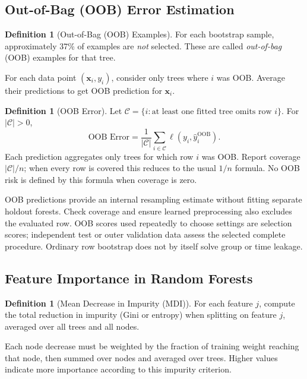 \documentclass[11pt,twoside]{article}
\numberwithin{equation}{section}
\newcommand{\vect}[1]{\bm{#1}}
\theoremstyle{plain}
\theoremstyle{definition}
\newtheorem{definition}[theorem]{Definition}
\theoremstyle{remark}
\newenvironment{keyidea}{
  \begin{tcolorbox}[colback=yellow!5!white,
                    colframe=yellow!50!black,
                    title=Key Idea,
                    breakable,
                    enhanced,
                    sharp corners,
                    boxrule=0.8pt,
                    left=6pt, right=6pt, top=6pt, bottom=6pt]
}{
  \end{tcolorbox}
}
\begin{document}
\subsection{Out-of-Bag (OOB) Error Estimation}

\begin{definition}[Out-of-Bag (OOB) Examples]
For each bootstrap sample, approximately 37\% of examples are \emph{not} selected. These are called \emph{out-of-bag} (OOB) examples for that tree.

For each data point $(\vect{x}_i, y_i)$, consider only trees where $i$ was OOB. Average their predictions to get OOB prediction for $\vect{x}_i$.
\end{definition}

\begin{definition}[OOB Error]
Let $\mathcal C=\{i:\text{at least one fitted tree omits row }i\}$. For $|\mathcal C|>0$,
\[
\text{OOB Error} = \frac{1}{|\mathcal C|}\sum_{i\in\mathcal C} \ell(y_i, \hat{y}_i^{\text{OOB}}).
\]
Each prediction aggregates only trees for which row $i$ was OOB. Report coverage $|\mathcal C|/n$; when every row is covered this reduces to the usual $1/n$ formula. No OOB risk is defined by this formula when coverage is zero.
\end{definition}

\begin{keyidea}
OOB predictions provide an internal resampling estimate without fitting separate holdout forests. Check coverage and ensure learned preprocessing also excludes the evaluated row. OOB scores used repeatedly to choose settings are selection scores; independent test or outer validation data assess the selected complete procedure. Ordinary row bootstrap does not by itself solve group or time leakage.
\end{keyidea}

\subsection{Feature Importance in Random Forests}

\begin{definition}[Mean Decrease in Impurity (MDI)]
For each feature $j$, compute the total reduction in impurity (Gini or entropy) when splitting on feature $j$, averaged over all trees and all nodes.

Each node decrease must be weighted by the fraction of training weight reaching that node, then summed over nodes and averaged over trees. Higher values indicate more importance according to this impurity criterion.
\end{definition}
\end{document}
